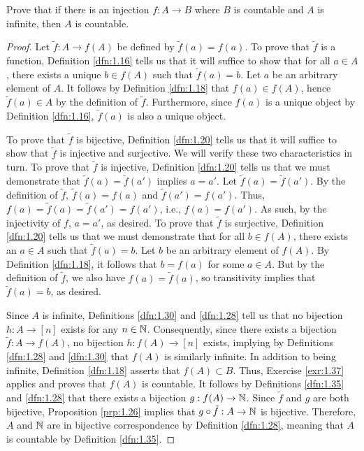 \documentclass[../main.tex]{subfiles}
\begin{document}
\begin{exercise}\label{exr:1.38}
    Prove that if there is an injection $f:A\to B$ where $B$ is countable and $A$ is infinite, then $A$ is countable.
    \begin{proof}
        Let $\tilde{f}:A\to f(A)$ be defined by $\tilde{f}(a)=f(a)$. To prove that $\tilde{f}$ is a function, Definition \ref{dfn:1.16} tells us that it will suffice to show that for all $a\in A$, there exists a unique $b\in f(A)$ such that $\tilde{f}(a)=b$. Let $a$ be an arbitrary element of $A$. It follows by Definition \ref{dfn:1.18} that $f(a)\in f(A)$, hence $\tilde{f}(a)\in A$ by the definition of $\tilde{f}$. Furthermore, since $f(a)$ is a unique object by Definition \ref{dfn:1.16}, $\tilde{f}(a)$ is also a unique object.\par
        To prove that $\tilde{f}$ is bijective, Definition \ref{dfn:1.20} tells us that it will suffice to show that $\tilde{f}$ is injective and surjective. We will verify these two characteristics in turn. To prove that $\tilde{f}$ is injective, Definition \ref{dfn:1.20} tells us that we must demonstrate that $\tilde{f}(a)=\tilde{f}(a')$ implies $a=a'$. Let $\tilde{f}(a)=\tilde{f}(a')$. By the definition of $\tilde{f}$, $\tilde{f}(a)=f(a)$ and $\tilde{f}(a')=f(a')$. Thus, $f(a)=\tilde{f}(a)=\tilde{f}(a')=f(a')$, i.e., $f(a)=f(a')$. As such, by the injectivity of $f$, $a=a'$, as desired. To prove that $\tilde{f}$ is surjective, Definition \ref{dfn:1.20} tells us that we must demonstrate that for all $b\in f(A)$, there exists an $a\in A$ such that $\tilde{f}(a)=b$. Let $b$ be an arbitrary element of $f(A)$. By Definition \ref{dfn:1.18}, it follows that $b=f(a)$ for some $a\in A$. But by the definition of $\tilde{f}$, we also have $f(a)=\tilde{f}(a)$, so transitivity implies that $\tilde{f}(a)=b$, as desired.\par
        Since $A$ is infinite, Definitions \ref{dfn:1.30} and \ref{dfn:1.28} tell us that no bijection $h:A\to[n]$ exists for any $n\in\mathbb{N}$. Consequently, since there exists a bijection $\tilde{f}:A\to f(A)$, no bijection $h:f(A)\to[n]$ exists, implying by Definitions \ref{dfn:1.28} and \ref{dfn:1.30} that $f(A)$ is similarly infinite. In addition to being infinite, Definition \ref{dfn:1.18} asserts that $f(A)\subset B$. Thus, Exercise \ref{exr:1.37} applies and proves that $f(A)$ is countable. It follows by Definitions \ref{dfn:1.35} and \ref{dfn:1.28} that there exists a bijection $g:f(A)\to\mathbb{N}$. Since $\tilde{f}$ and $g$ are both bijective, Proposition \ref{prp:1.26} implies that $g\circ\tilde{f}:A\to\mathbb{N}$ is bijective. Therefore, $A$ and $\mathbb{N}$ are in bijective correspondence by Definition \ref{dfn:1.28}, meaning that $A$ is countable by Definition \ref{dfn:1.35}.
    \end{proof}
\end{exercise}
\end{document}
